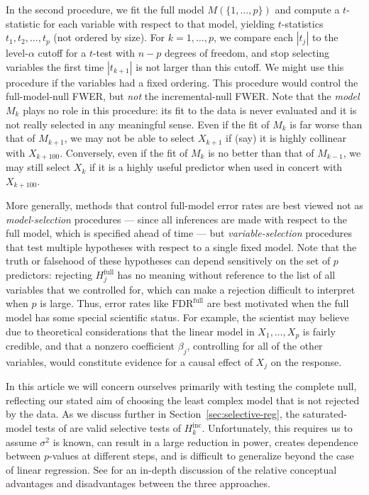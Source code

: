 \documentclass{article}
\begin{document}

In the second procedure, we fit the full model $M(\{1,\ldots,p\})$ and compute a $t$-statistic for each variable with respect to that model, yielding $t$-statistics $t_1, t_2, \ldots, t_p$ (not ordered by size). For $k=1,\ldots,p$, we compare each $|t_j|$ to the level-$\alpha$ cutoff for a $t$-test with $n-p$ degrees of freedom, and stop selecting variables the first time $|t_{k+1}|$ is not larger than this cutoff. We might use this procedure if the variables had a  fixed ordering.
This procedure would control the full-model-null FWER, but {\em not} the incremental-null FWER. Note that the {\em model} $M_k$ plays no role in this procedure: its fit to the data is never evaluated and it is not really selected in any meaningful sense. Even if the fit of $M_k$ is far worse than that of $M_{k+1}$, we may not be able to select $X_{k+1}$ if (say) it is highly collinear with $X_{k+100}$. Conversely, even if the fit of $M_k$ is no better than that of $M_{k-1}$, we may still select $X_k$ if it is a highly useful predictor when used in concert with $X_{k+100}$.

More generally, methods that control full-model error rates are best viewed not as {\em model-selection} procedures --- since all inferences are made with respect to the full model, which is specified ahead of time --- but {\em variable-selection} procedures that test multiple hypotheses with respect to a single fixed model. Note that the truth or falsehood of these hypotheses can depend sensitively on the set of $p$ predictors: rejecting $H_j^{\text{full}}$ has no meaning without reference to the list of all variables that we controlled for, which can make a rejection difficult to interpret when $p$ is large. Thus, error rates like $\text{FDR}^{\text{full}}$ are best motivated when the full model has some special scientific status. For example, the scientist may believe due to theoretical considerations that the linear model in $X_1,\ldots,X_p$ is fairly credible, and that a nonzero coefficient $\beta_j$, controlling for all of the other variables, would constitute evidence for a causal effect of $X_j$ on the response.

In this article we will concern ourselves primarily with testing the complete null, reflecting our stated aim of choosing the least complex model that is not rejected by the data. As we discuss further in Section~\ref{sec:selective-reg}, the saturated-model tests of \citet{taylor2014exact} are valid selective tests of $H_k^{\text{inc}}$. Unfortunately, this requires us to assume $\sigma^2$ is known, can result in a large reduction in power, creates dependence between $p$-values at different steps, and is difficult to generalize beyond the case of linear regression. See \citet{gsell2013false} for an in-depth discussion of the relative conceptual advantages and disadvantages between the three approaches.
\end{document}
